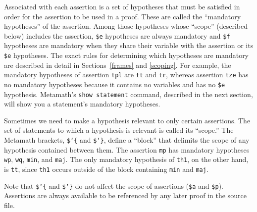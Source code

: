 Associated with each assertion is a set of hypotheses
that must be satisfied in order for the assertion to be used in a proof.
These are called the ``mandatory hypotheses'' of the assertion.  Among those hypotheses whose ``scope''
(described below) includes the assertion, \texttt{\$e} hypotheses are
always mandatory and \texttt{\$f}
hypotheses are mandatory when they share their variable with the
assertion or its \texttt{\$e} hypotheses.  The exact rules for
determining which hypotheses are mandatory are described in detail in
Sections~\ref{frames} and \ref{scoping}.  For example, the mandatory
hypotheses of assertion \texttt{tpl} are \texttt{tt} and \texttt{tr},
whereas assertion \texttt{tze} has no mandatory hypotheses because it
contains no variables and has no \texttt{\$e} hypothesis.  Metamath's \texttt{show statement}
command, described in the next
section, will show you a statement's mandatory hypotheses.

Sometimes we need to make a hypothesis relevant to only certain
assertions.  The set of statements to which a hypothesis is relevant is
called its ``scope.''  The Metamath brackets,
\texttt{\$\char`\{} and \texttt{\$\char`\}}, define a ``block'' that
delimits the scope of any hypothesis contained between them.  The
assertion \texttt{mp} has mandatory hypotheses \texttt{wp}, \texttt{wq},
\texttt{min}, and \texttt{maj}.  The only mandatory hypothesis of
\texttt{th1}, on the other hand, is \texttt{tt}, since \texttt{th1}
occurs outside of the block containing \texttt{min} and \texttt{maj}.

Note that \texttt{\$\char`\{} and \texttt{\$\char`\}} do not affect the
scope of assertions (\texttt{\$a} and \texttt{\$p}).  Assertions are always
available to be referenced by any later proof in the source file.

